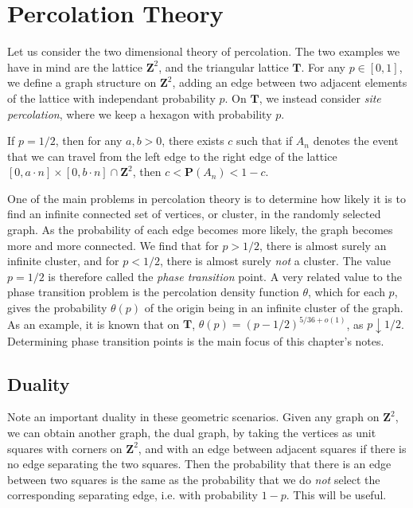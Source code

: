 \chapter{Percolation Theory}

Let us consider the two dimensional theory of percolation. The two examples we have in mind are the lattice $\mathbf{Z}^2$, and the triangular lattice $\mathbf{T}$. For any $p \in [0,1]$, we define a graph structure on $\mathbf{Z}^2$, adding an edge between two adjacent elements of the lattice with independant probability $p$. On $\mathbf{T}$, we instead consider {\it site percolation}, where we keep a hexagon with probability $p$.

\begin{theorem}
    If $p = 1/2$, then for any $a,b > 0$, there exists $c$ such that if $A_n$ denotes the event that we can travel from the left edge to the right edge of the lattice $[0,a \cdot n] \times [0, b \cdot n] \cap \mathbf{Z}^2$, then $c < \mathbf{P}(A_n) < 1 - c$.
\end{theorem}

One of the main problems in percolation theory is to determine how likely it is to find an infinite connected set of vertices, or cluster, in the randomly selected graph. As the probability of each edge becomes more likely, the graph becomes more and more connected. We find that for $p > 1/2$, there is almost surely an infinite cluster, and for $p < 1/2$, there is almost surely {\it not} a cluster. The value $p = 1/2$ is therefore called the {\it phase transition} point. A very related value to the phase transition problem is the percolation density function $\theta$, which for each $p$, gives the probability $\theta(p)$ of the origin being in an infinite cluster of the graph. As an example, it is known that on $\mathbf{T}$, $\theta(p) = (p - 1/2)^{5/36 + o(1)}$, as $p \downarrow 1/2$. Determining phase transition points is the main focus of this chapter's notes.

\section{Duality}

Note an important duality in these geometric scenarios. Given any graph on $\mathbf{Z}^2$, we can obtain another graph, the dual graph, by taking the vertices as unit squares with corners on $\mathbf{Z}^2$, and with an edge between adjacent squares if there is no edge separating the two squares. Then the probability that there is an edge between two squares is the same as the probability that we do {\it not} select the corresponding separating edge, i.e. with probability $1 - p$. This will be useful.

